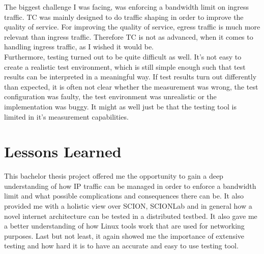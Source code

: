 The biggest challenge I was facing, was enforcing a bandwidth limit on ingress traffic. \acs{TC} was mainly designed to do traffic shaping in order to improve the quality of service. For improving the quality of service, egress traffic is much more relevant than ingress traffic. Therefore \acs{TC} is not as advanced, when it comes to handling ingress traffic, as I wished it would be.
\\
Furthermore, testing turned out to be quite difficult as well. It's not easy to create a realistic test environment, which is still simple enough such that test results can be interpreted in a meaningful way. If test results turn out differently than expected, it is often not clear whether the measurement was wrong, the test configuration was faulty, the test environment was unrealistic or the implementation was buggy. It might as well just be that the testing tool is limited in it's measurement capabilities. 

\section{Lessons Learned}

This bachelor thesis project offered me the opportunity to gain a deep understanding of how \acs{IP} traffic can be managed in order to enforce a bandwidth limit and what possible complications and consequences there can be. It also provided me with a holistic view over \acs{SCION}, \acs{SCIONLab} and in general how a novel internet architecture can be tested in a distributed testbed. It also gave me a better understanding of how Linux tools work that are used for networking purposes. Last but not least, it again showed me the importance of extensive testing and how hard it is to have an accurate and easy to use testing tool.
